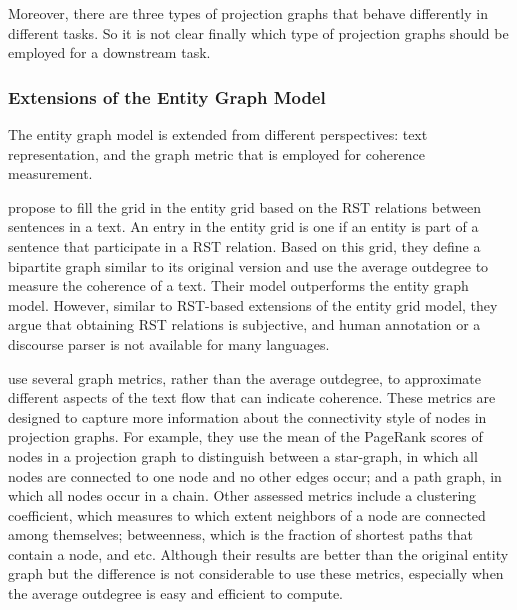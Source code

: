 Moreover, there are three types of projection graphs that behave differently in different tasks. 
So it is not clear finally which type of projection graphs should be employed for a downstream task. 

\subsubsection{Extensions of the Entity Graph Model}

The entity graph model is extended from different perspectives: text representation, and the graph metric that is employed for coherence measurement. 

 propose to fill the grid in the entity grid based on the RST relations between sentences in a text. 
An entry in the entity grid is one if an entity is part of a sentence that participate in a RST relation.
Based on this grid, they define a bipartite graph similar to its original version and use the average outdegree to measure the coherence of a text. 
Their model outperforms the entity graph model. 
However, similar to RST-based extensions of the entity grid model, they argue that obtaining RST relations is subjective, and human annotation or a discourse parser is not available for many languages. 

 use several graph metrics, rather than the average outdegree, to approximate different aspects of the text flow that can indicate coherence.  
These metrics are designed to capture more information about the connectivity style of nodes in projection graphs. 
For example, they use the mean of the PageRank scores \cite{newmanmark10}  of nodes in a projection graph to distinguish between a star-graph, in which all nodes are connected to one node and no other edges occur; and a path graph, in which all nodes occur in a chain. 
Other assessed metrics include a clustering coefficient, which measures to which extent neighbors of a node are connected among themselves; betweenness, which is the fraction of shortest paths that contain a node, and etc. 
Although their results are better than the original entity graph but the difference is not considerable to use these metrics, especially when the average outdegree is easy and efficient to compute. 


